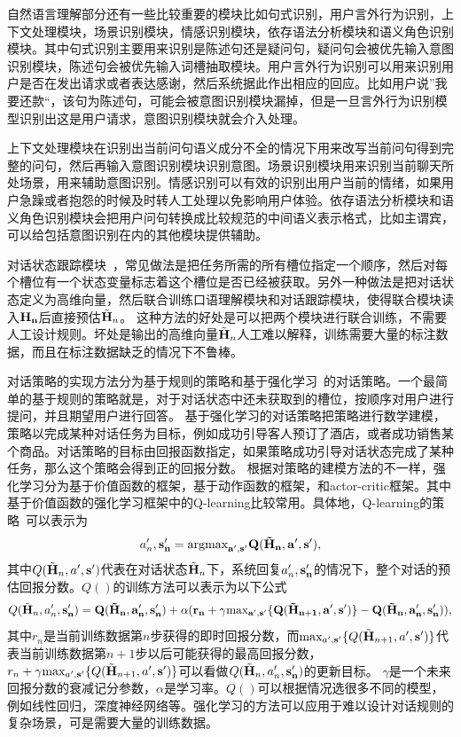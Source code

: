 自然语言理解部分还有一些比较重要的模块比如句式识别，用户言外行为识别，上下文处理模块，场景识别模块，情感识别模块，依存语法分析模块和语义角色识别模块。其中句式识别主要用来识别是陈述句还是疑问句，疑问句会被优先输入意图识别模块，陈述句会被优先输入词槽抽取模块。用户言外行为识别可以用来识别用户是否在发出请求或者表达感谢，然后系统据此作出相应的回应。比如用户说”我要还款“，该句为陈述句，可能会被意图识别模块漏掉，但是一旦言外行为识别模型识别出这是用户请求，意图识别模块就会介入处理。

上下文处理模块在识别出当前问句语义成分不全的情况下用来改写当前问句得到完整的问句，然后再输入意图识别模块识别意图。场景识别模块用来识别当前聊天所处场景，用来辅助意图识别。情感识别可以有效的识别出用户当前的情绪，如果用户急躁或者抱怨的时候及时转人工处理以免影响用户体验。依存语法分析模块和语义角色识别模块会把用户问句转换成比较规范的中间语义表示格式，比如主谓宾，可以给包括意图识别在内的其他模块提供辅助。

对话状态跟踪模块~\cite{young2007hidden,henderson2014robust,henderson2014word}，常见做法是把任务所需的所有槽位指定一个顺序，然后对每个槽位有一个状态变量标志着这个槽位是否已经被获取。另外一种做法是把对话状态定义为高维向量，然后联合训练口语理解模块和对话跟踪模块，使得联合模块读入$\bf{H}_n$后直接预估$\tilde{\bf{H}}_n$。 这种方法的好处是可以把两个模块进行联合训练，不需要人工设计规则。坏处是输出的高维向量$\tilde{\bf{H}}_n$人工难以解释，训练需要大量的标注数据，而且在标注数据缺乏的情况下不鲁棒。 

对话策略的实现方法分为基于规则的策略和基于强化学习~\cite{sutton1998reinforcement}的对话策略。一个最简单的基于规则的策略就是，对于对话状态中还未获取到的槽位，按顺序对用户进行提问，并且期望用户进行回答。
基于强化学习的对话策略把策略进行数学建模，策略以完成某种对话任务为目标，例如成功引导客人预订了酒店，或者成功销售某个商品。对话策略的目标由回报函数指定，如果策略成功引导对话状态完成了某种任务，那么这个策略会得到正的回报分数。
根据对策略的建模方法的不一样，强化学习分为基于价值函数的框架，基于动作函数的框架，和actor-critic框架。其中基于价值函数的强化学习框架中的Q-learning比较常用。具体地，Q-learning的策略~\cite{watkins1989learning}可以表示为
$$a'_n,\bf{s}'_n = \text{argmax}_{a',\bf{s}'} Q(\tilde{\bf{H}}_n, a',\bf{s}'),$$ 
其中$Q(\tilde{\bf{H}}_n, a',\bf{s}')$代表在对话状态$\tilde{\bf{H}}_n$下，系统回复$a'_n,\bf{s}'_n$的情况下，整个对话的预估回报分数。$Q()$的训练方法可以表示为以下公式
$$Q(\tilde{\bf{H}}_n, a'_n,\bf{s}'_n) = Q(\tilde{\bf{H}}_n, a'_n,\bf{s}'_n) + \alpha ( r_n + \gamma \text{max}_{a',\bf{s}'} \{ Q(\tilde{\bf{H}}_{n+1}, a',\bf{s}') \} - Q(\tilde{\bf{H}}_n, a'_n,\bf{s}'_n)),$$ 其中$r_n$是当前训练数据第$n$步获得的即时回报分数，而$\text{max}_{a',\bf{s}'} \{ Q(\tilde{\bf{H}}_{n+1}, a',\bf{s}') \}$代表当前训练数据第$n+1$步以后可能获得的最高回报分数，$r_n + \gamma \text{max}_{a',\bf{s}'} \{ Q(\tilde{\bf{H}}_{n+1}, a',\bf{s}') \}$可以看做$Q(\tilde{\bf{H}}_n, a'_n,\bf{s}'_n)$的更新目标。 $\gamma$是一个未来回报分数的衰减记分参数，$\alpha$是学习率。$Q()$可以根据情况选很多不同的模型，例如线性回归，深度神经网络等。强化学习的方法可以应用于难以设计对话规则的复杂场景，可是需要大量的训练数据。

